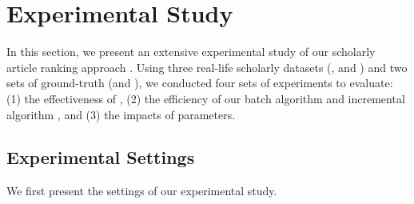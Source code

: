\section{Experimental Study}
\label{sec-exp}

In this section, we present an extensive experimental study of our scholarly article ranking approach \ensemblerank.
Using three real-life scholarly datasets (\aan, \aminer and \magdata) and two sets of ground-truth (\recom and \fcita), we conducted four sets of experiments to evaluate: (1) the effectiveness of \ensemblerank,
(2) the efficiency of our batch algorithm \batensemble and incremental algorithm \incensemble, and (3) the impacts of parameters. %

\subsection{Experimental Settings}

We first present the settings of our experimental study.


